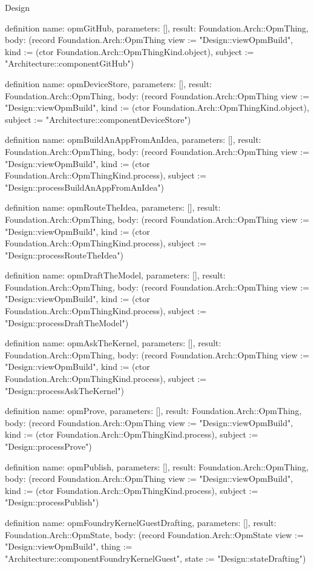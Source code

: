 \begin{lexlean}{Design}
\begin{semanticmodule}
definition{
  name: opmGitHub,
  parameters: [],
  result: Foundation.Arch::OpmThing,
  body: (record Foundation.Arch::OpmThing {view := "Design::viewOpmBuild", kind := (ctor Foundation.Arch::OpmThingKind.object), subject := "Architecture::componentGitHub"})
}

definition{
  name: opmDeviceStore,
  parameters: [],
  result: Foundation.Arch::OpmThing,
  body: (record Foundation.Arch::OpmThing {view := "Design::viewOpmBuild", kind := (ctor Foundation.Arch::OpmThingKind.object), subject := "Architecture::componentDeviceStore"})
}

definition{
  name: opmBuildAnAppFromAnIdea,
  parameters: [],
  result: Foundation.Arch::OpmThing,
  body: (record Foundation.Arch::OpmThing {view := "Design::viewOpmBuild", kind := (ctor Foundation.Arch::OpmThingKind.process), subject := "Design::processBuildAnAppFromAnIdea"})
}

definition{
  name: opmRouteTheIdea,
  parameters: [],
  result: Foundation.Arch::OpmThing,
  body: (record Foundation.Arch::OpmThing {view := "Design::viewOpmBuild", kind := (ctor Foundation.Arch::OpmThingKind.process), subject := "Design::processRouteTheIdea"})
}

definition{
  name: opmDraftTheModel,
  parameters: [],
  result: Foundation.Arch::OpmThing,
  body: (record Foundation.Arch::OpmThing {view := "Design::viewOpmBuild", kind := (ctor Foundation.Arch::OpmThingKind.process), subject := "Design::processDraftTheModel"})
}

definition{
  name: opmAskTheKernel,
  parameters: [],
  result: Foundation.Arch::OpmThing,
  body: (record Foundation.Arch::OpmThing {view := "Design::viewOpmBuild", kind := (ctor Foundation.Arch::OpmThingKind.process), subject := "Design::processAskTheKernel"})
}

definition{
  name: opmProve,
  parameters: [],
  result: Foundation.Arch::OpmThing,
  body: (record Foundation.Arch::OpmThing {view := "Design::viewOpmBuild", kind := (ctor Foundation.Arch::OpmThingKind.process), subject := "Design::processProve"})
}

definition{
  name: opmPublish,
  parameters: [],
  result: Foundation.Arch::OpmThing,
  body: (record Foundation.Arch::OpmThing {view := "Design::viewOpmBuild", kind := (ctor Foundation.Arch::OpmThingKind.process), subject := "Design::processPublish"})
}

definition{
  name: opmFoundryKernelGuestDrafting,
  parameters: [],
  result: Foundation.Arch::OpmState,
  body: (record Foundation.Arch::OpmState {view := "Design::viewOpmBuild", thing := "Architecture::componentFoundryKernelGuest", state := "Design::stateDrafting"})
}


\end{semanticmodule}
\end{lexlean}
